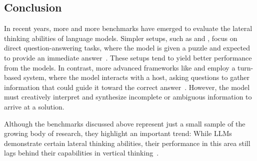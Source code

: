 \subsection{Conclusion}

In recent years, more and more benchmarks have emerged to evaluate the lateral thinking abilities of language models. Simpler setups, such as  and , focus on direct question-answering tasks, where the model is given a puzzle and expected to provide an immediate answer~\cite{linRiddleSenseReasoningRiddle2021, jiangBRAINTEASERLateralThinking2023}. These setups tend to yield better performance from the models. In contrast, more advanced frameworks like  and  employ a turn-based system, where the model interacts with a host, asking questions to gather information that could guide it toward the correct answer~\cite{huangLatEvalInteractiveLLMs2024, chenWeakevalStrongEvaluatingEliciting2024}. However, the model must creatively interpret and synthesize incomplete or ambiguous information to arrive at a solution.

Although the benchmarks discussed above represent just a small sample of the growing body of research, they highlight an important trend: While \acp{LLM} demonstrate certain lateral thinking abilities, their performance in this area still lags behind their capabilities in vertical thinking~\cite{linRiddleSenseReasoningRiddle2021, jiangBRAINTEASERLateralThinking2023, huangLatEvalInteractiveLLMs2024,chenWeakevalStrongEvaluatingEliciting2024}.

